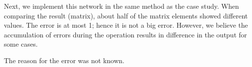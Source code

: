 Next, we implement this network in the same method as the case study. When comparing the result (matrix), about half of the matrix elements showed different values. The error is at most 1; hence it is not a big error. However, we believe the accumulation of errors during the operation results in difference in the output for some cases.

The reason for the error was not known.

